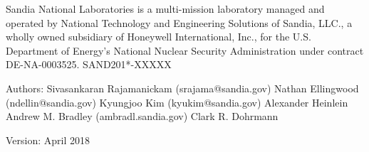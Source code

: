\documentclass[a4paper,11pt]{book}
\begin{document}

\noindent
Sandia National Laboratories is a multi-mission laboratory managed and operated by National Technology and 
Engineering Solutions of Sandia, LLC., a wholly owned subsidiary of Honeywell International, Inc., for the U.S. 
Department of Energy’s National Nuclear Security Administration under contract DE-NA-0003525. 
\newline
\newline
\noindent
SAND201*-XXXXX

\vspace{4cm}
\noindent 
Authors: \newline\newline
Sivasankaran Rajamanickam (srajama@sandia.gov)\newline
Nathan Ellingwood (ndellin@sandia.gov)\newline
Kyungjoo Kim (kyukim@sandia.gov)\newline
Alexander Heinlein\newline
Andrew M. Bradley (ambradl.sandia.gov)\newline
Clark R. Dohrmann

\vspace{1cm}
\noindent 
Version: \newline{} April 2018 \newline\newline


\tableofcontents









\clearpage


%
\end{document}

